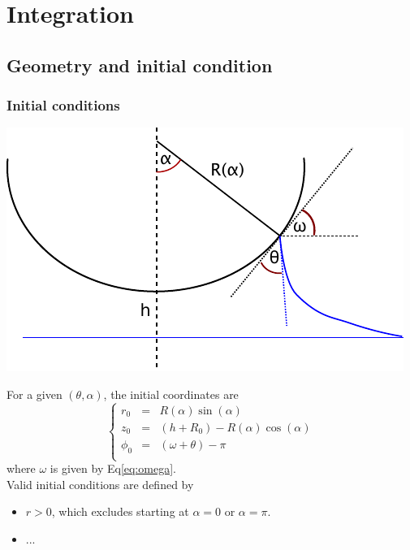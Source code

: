 \documentclass[aps,onecolumn]{revtex4}
\begin{document}
\section{Integration}

\subsection{Geometry and initial condition}

\subsubsection{Initial conditions}

\begin{center}
\includegraphics{geometry.pdf}
\end{center}

For a given $(\theta,\alpha)$, the initial coordinates are
\begin{equation}
\left\lbrace
\begin{array}{rcl}
	r_0    & = & R(\alpha) \sin(\alpha)\\
	z_0    & = & (h + R_0) - R(\alpha) \cos(\alpha)\\
	\phi_0 & = & \left(\omega + \theta\right) - \pi\\
\end{array}
\right. 
\end{equation}
where $\omega$ is given by Eq\eqref{eq:omega}.\\

Valid initial conditions are defined by
\begin{itemize}
\item $r>0$, which excludes starting at $\alpha=0$ or $\alpha=\pi$.
\item ...
\end{itemize}
\end{document}

